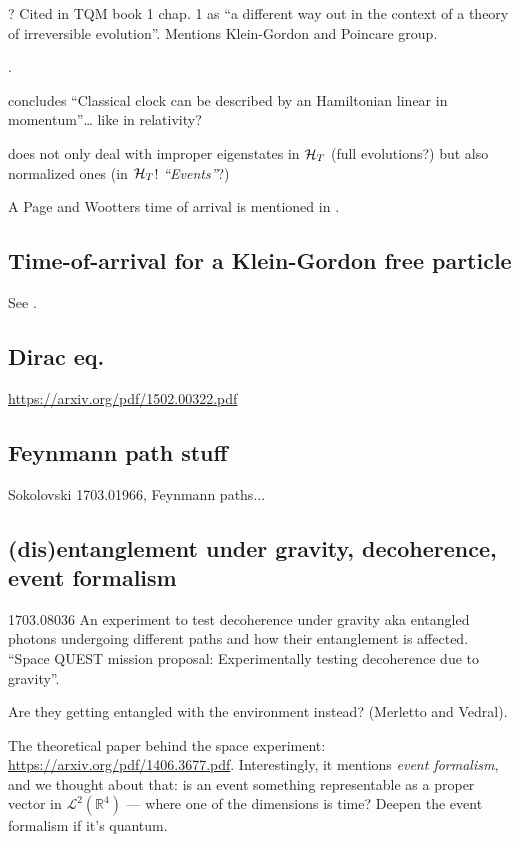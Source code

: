 \cite{Misra}? Cited in TQM book 1 chap. 1 as 
``a different way out in the context of a theory of irreversible evolution''.
Mentions Klein-Gordon and Poincare group.

\cite{RealisticClocks}.

\cite{HarmonicClocks} concludes ``Classical clock can be described by an Hamiltonian linear in momentum''\dots
like in relativity?

\cite{Lloyd:Time} does not only deal with improper eigenstates in $\mathcal{H}_T$
(full evolutions?)
but also normalized ones (in $\mathcal{H}_T$! \emph{``Events''}?)

A Page and Wootters time of arrival is mentioned in \cite{Gambini_PW}.

\subsection{Time-of-arrival for a Klein-Gordon free particle}

See \cite{Galapon_KG}.

\subsection{Dirac eq.}

\url{https://arxiv.org/pdf/1502.00322.pdf}



\subsection{Feynmann path stuff}

Sokolovski 1703.01966, Feynmann paths...\subsection{(dis)entanglement under gravity, decoherence, event formalism}

1703.08036 An experiment to test decoherence under gravity aka entangled photons undergoing different paths and how their entanglement is affected.
``Space QUEST mission proposal: Experimentally testing decoherence due to gravity''.

Are they getting entangled with the environment instead? (Merletto and Vedral).

The theoretical paper behind the space experiment: \url{https://arxiv.org/pdf/1406.3677.pdf}. Interestingly, it mentions 
\emph{event formalism}, and we thought about that: is an event something
representable as a proper vector in $\mathscr{L}^2(\mathbb{R}^4)$ --- where one of the dimensions is time?
Deepen the event formalism if it's quantum.

